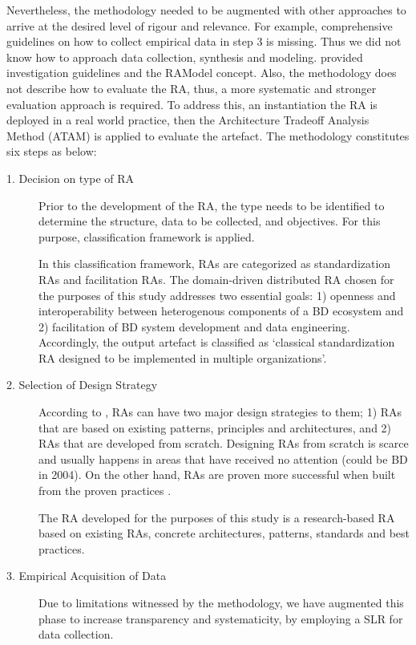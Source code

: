 \documentclass[a4paper,11pt]{article}
\let\cite\citep
\begin{document}
Nevertheless, the methodology needed to be augmented with other approaches to arrive at the desired level of rigour and relevance. For example, comprehensive guidelines on how to collect empirical data in step 3 is missing. Thus we did not know how to approach data collection, synthesis and modeling.  \citet{Nakagawa} provided
investigation guidelines and the RAModel concept. Also, the methodology does not describe how to evaluate the RA, thus, a more systematic and stronger evaluation approach is required. To address this, an instantiation the RA is deployed in a real world practice, then the Architecture Tradeoff Analysis Method (ATAM) \cite{KazmanATAM} is applied to evaluate the artefact. The methodology constitutes six steps as below:  


\begin{description}
\item[1. Decision on type of RA] Prior to the development of the RA, the type needs to be identified to determine the structure, data to be collected, and objectives. For this purpose, \citet{angelov2009classification} classification framework is applied. 
 

In this classification framework, RAs are categorized as standardization RAs and facilitation RAs. The domain-driven distributed RA chosen for the purposes of this study addresses two essential goals: 1) openness and interoperability between heterogenous components of a BD ecosystem and 2) facilitation of BD system development and data engineering. Accordingly, the output artefact is classified as `classical standardization RA designed to be implemented in multiple organizations'. 

\item[2. Selection of Design Strategy] According to \citet{galster2011empirically}, RAs can have two major design strategies to them; 1) RAs that are based on existing patterns, principles and architectures, and 2) RAs that are developed from scratch. Designing RAs from scratch is scarce and usually happens in areas that have received no attention (could be BD in 2004). On the other hand, RAs are proven more successful when built from the proven practices \cite{Cloutier}. 

The RA developed for the purposes of this study is a research-based RA based on existing RAs, concrete architectures, patterns, standards and best practices.

\item[3. Empirical Acquisition of Data] Due to limitations witnessed by the \citet{galster2011empirically} methodology, we have augmented this phase to increase transparency and systematicity, by employing a SLR for data collection. 



\end{description}
\end{document}

